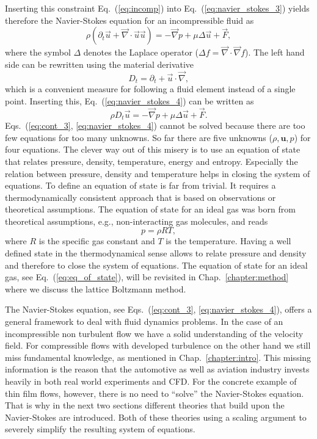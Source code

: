 Inserting this constraint Eq.~(\ref{eq:incomp}) into Eq.~(\ref{eq:navier_stokes_3}) yields therefore the Navier-Stokes equation for an incompressible fluid as
\begin{equation}\label{eq:navier_stokes_4}
    \rho(\partial_t\vec{u} + \vec{\nabla}\cdot\vec{u}\vec{u}) = - \vec{\nabla} p + \mu\Delta\vec{u} + \vec{F},
\end{equation}
where the symbol $\Delta$ denotes the Laplace operator ($\Delta f = \vec{\nabla}\cdot\vec{\nabla} f$).
The left hand side can be rewritten using the material derivative
\begin{equation}\label{eq:mat_dev}
    D_t = \partial_t + \vec{u}\cdot\vec{\nabla}, 
\end{equation}
which is a convenient measure for following a fluid element instead of a single point.
Inserting this, Eq.~(\ref{eq:navier_stokes_4}) can be written as
\begin{equation}\label{eq:navier_stokes_fin}
    \rho D_t \vec{u} =  - \vec{\nabla} p + \mu\Delta\vec{u} + \vec{F}.
\end{equation}
Eqs.~(\ref{eq:cont_3}, \ref{eq:navier_stokes_4}) cannot be solved because there are too few equations for too many unknowns.
So far there are five unknowns ($\rho, \mathbf{u}, p$) for four equations.
The clever way out of this misery is to use an equation of state that relates pressure, density, temperature, energy and entropy.
Especially the relation between pressure, density and temperature helps in closing the system of equations.
To define an equation of state is far from trivial.
It requires a thermodynamically consistent approach that is based on observations or theoretical assumptions.
The equation of state for an ideal gas was born from theoretical assumptions, e.g., non-interacting gas molecules, and reads~\cite{schwablStatisticalMechanics2006}
\begin{equation}\label{eq:eq_of_state}
    p = \rho R T,
\end{equation}
where $R$ is the specific gas constant and $T$ is the temperature.
Having a well defined state in the thermodynamical sense allows to relate pressure and density and therefore to close the system of equations.
The equation of state for an ideal gas, see Eq.~(\ref{eq:eq_of_state}), will be revisited in Chap.~\ref{chapter:method} where we discuss the lattice Boltzmann method.

The Navier-Stokes equation, see Eqs.~(\ref{eq:cont_3}, \ref{eq:navier_stokes_4}), offers a general framework to deal with fluid dynamics problems.
In the case of an incompressible non turbulent flow we have a solid understanding of the velocity field.
For compressible flows with developed turbulence on the other hand we still miss fundamental knowledge, as mentioned in Chap.~\ref{chapter:intro}.
This missing information is the reason that the automotive as well as aviation industry invests heavily in both real world experiments and CFD. 
For the concrete example of thin film flows, however, there is no need to ``solve'' the Navier-Stokes equation.
That is why in the next two sections different theories that build upon the Navier-Stokes are introduced.
Both of these theories using a scaling argument to severely simplify the resulting system of equations.

